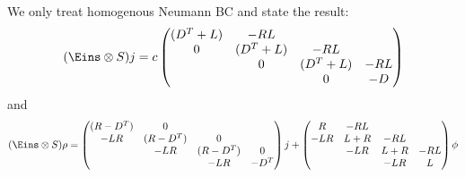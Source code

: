 \documentclass[a4paper,12pt]{scrartcl}
\begin{document}
We only treat homogenous Neumann BC and state the result:
\begin{align}
    (\Eins\otimes S) j = c
    \begin{pmatrix}
        (D^T+L) & -RL & &  \\
          0 & (D^T + L) & -RL & \\
            &0& (D^T + L) & -RL \\
            & &0& -D  
    \end{pmatrix}
    \label{}
\end{align}
and 
\begin{align}
    (\Eins\otimes S) \rho =
    \begin{pmatrix}
        (R-D^T) &0 & &\\
        -LR & (R-D^T) &0 & \\
            & -LR & (R-D^T) &0\\
            & & -LR & -D^T
    \end{pmatrix}j+
    \begin{pmatrix}
        R & -RL & &\\
        -LR & L+R & -RL&\\
            & -LR & L+R & -RL\\
            & & -LR & L
    \end{pmatrix}\phi
    \label{}
\end{align}










\end{document}

